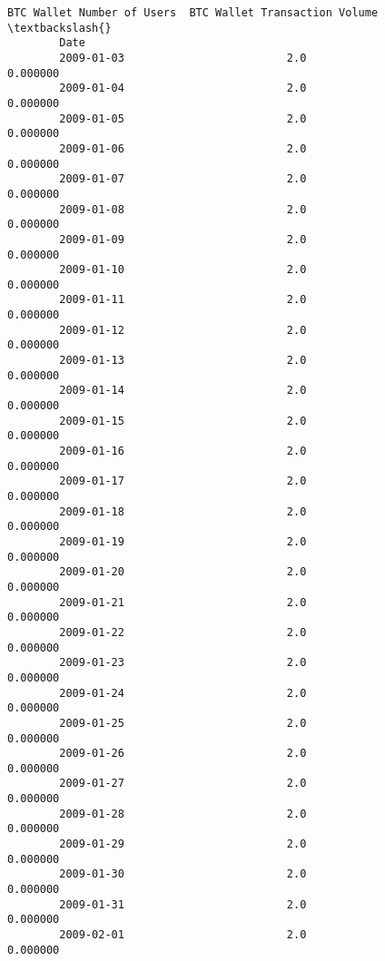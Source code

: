 \documentclass[11pt]{article}
\begin{document}
\begin{Verbatim}[commandchars=\\\{\}]
                    BTC Wallet Number of Users  BTC Wallet Transaction Volume  \textbackslash{}
        Date                                                                    
        2009-01-03                         2.0                       0.000000   
        2009-01-04                         2.0                       0.000000   
        2009-01-05                         2.0                       0.000000   
        2009-01-06                         2.0                       0.000000   
        2009-01-07                         2.0                       0.000000   
        2009-01-08                         2.0                       0.000000   
        2009-01-09                         2.0                       0.000000   
        2009-01-10                         2.0                       0.000000   
        2009-01-11                         2.0                       0.000000   
        2009-01-12                         2.0                       0.000000   
        2009-01-13                         2.0                       0.000000   
        2009-01-14                         2.0                       0.000000   
        2009-01-15                         2.0                       0.000000   
        2009-01-16                         2.0                       0.000000   
        2009-01-17                         2.0                       0.000000   
        2009-01-18                         2.0                       0.000000   
        2009-01-19                         2.0                       0.000000   
        2009-01-20                         2.0                       0.000000   
        2009-01-21                         2.0                       0.000000   
        2009-01-22                         2.0                       0.000000   
        2009-01-23                         2.0                       0.000000   
        2009-01-24                         2.0                       0.000000   
        2009-01-25                         2.0                       0.000000   
        2009-01-26                         2.0                       0.000000   
        2009-01-27                         2.0                       0.000000   
        2009-01-28                         2.0                       0.000000   
        2009-01-29                         2.0                       0.000000   
        2009-01-30                         2.0                       0.000000   
        2009-01-31                         2.0                       0.000000   
        2009-02-01                         2.0                       0.000000   

\end{Verbatim}
\end{document}
